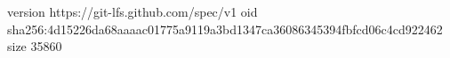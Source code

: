 version https://git-lfs.github.com/spec/v1
oid sha256:4d15226da68aaaac01775a9119a3bd1347ca36086345394fbfcd06c4cd922462
size 35860
